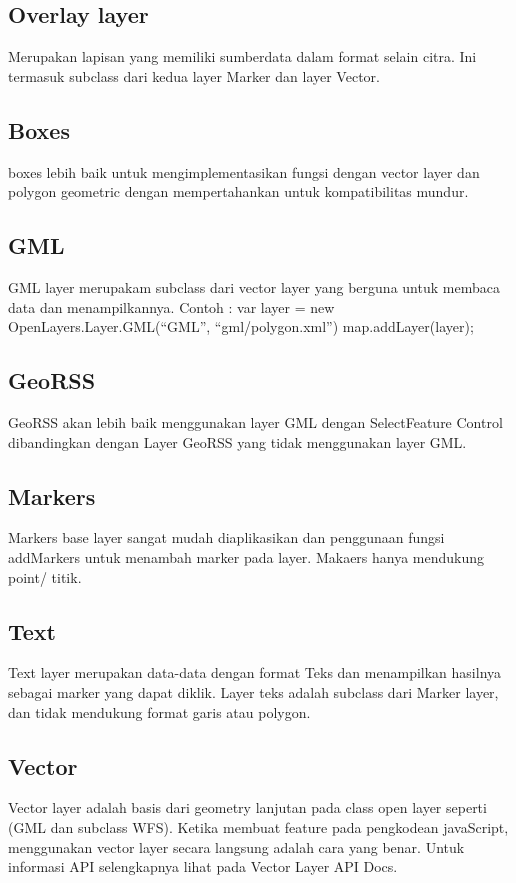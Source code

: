 \documentclass{article}
\begin{document}
\subsection {Overlay layer}
Merupakan lapisan yang memiliki sumberdata dalam format selain citra. Ini termasuk subclass dari kedua layer Marker dan layer Vector.

\subsection {Boxes}
boxes lebih baik untuk mengimplementasikan fungsi dengan vector layer dan polygon geometric dengan mempertahankan untuk kompatibilitas mundur.

\subsection {GML}
GML layer merupakam subclass dari vector layer yang berguna untuk membaca data dan menampilkannya. 
Contoh :
var layer = new OpenLayers.Layer.GML(“GML”, “gml/polygon.xml”)
map.addLayer(layer);

\subsection {GeoRSS}
GeoRSS akan  lebih baik menggunakan layer GML dengan SelectFeature Control dibandingkan dengan Layer GeoRSS yang tidak menggunakan layer GML.

\subsection {Markers}
Markers base layer sangat mudah diaplikasikan dan penggunaan fungsi addMarkers untuk menambah marker pada layer. Makaers hanya mendukung point/ titik.

\subsection {Text}
Text layer merupakan data-data dengan format Teks dan menampilkan hasilnya sebagai marker yang dapat diklik. Layer teks adalah subclass dari Marker layer, dan tidak mendukung format garis atau polygon.

\subsection {Vector}
Vector layer adalah basis dari geometry lanjutan pada class open layer seperti (GML dan subclass WFS). Ketika membuat feature pada pengkodean javaScript, menggunakan vector layer secara langsung adalah cara yang benar.
Untuk informasi API selengkapnya lihat pada Vector Layer API Docs.
\end{document}
